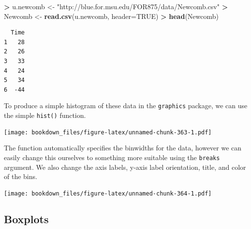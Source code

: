 \documentclass[]{krantz}
\makeatletter
\newenvironment{Shaded}{\begin{snugshade}}{\end{snugshade}}
\newcommand{\KeywordTok}[1]{\textcolor[rgb]{0.27,0.27,0.27}{\textbf{#1}}}
\newcommand{\DataTypeTok}[1]{\textcolor[rgb]{0.27,0.27,0.27}{#1}}
\newcommand{\DecValTok}[1]{\textcolor[rgb]{0.06,0.06,0.06}{#1}}
\newcommand{\StringTok}[1]{\textcolor[rgb]{0.5,0.5,0.5}{#1}}
\newcommand{\OtherTok}[1]{\textcolor[rgb]{0.37,0.37,0.37}{#1}}
\newcommand{\OperatorTok}[1]{\textcolor[rgb]{0.43,0.43,0.43}{\textbf{#1}}}
\newcommand{\NormalTok}[1]{#1}
\newenvironment{kframe}{%
\medskip{}
\setlength{\fboxsep}{.8em}
 \def\at@end@of@kframe{}%
 \ifinner\ifhmode%
  \def\at@end@of@kframe{\end{minipage}}%
  \begin{minipage}{\columnwidth}%
 \fi\fi%
 \def\FrameCommand##1{\hskip\@totalleftmargin \hskip-\fboxsep
 \colorbox{shadecolor}{##1}\hskip-\fboxsep
     \hskip-\linewidth \hskip-\@totalleftmargin \hskip\columnwidth}%
 \MakeFramed {\advance\hsize-\width
   \@totalleftmargin\z@ \linewidth\hsize
   \@setminipage}}%
 {\par\unskip\endMakeFramed%
 \at@end@of@kframe}
\renewenvironment{Shaded}{\begin{kframe}}{\end{kframe}}
\makeatother
\begin{document}
\begin{Shaded}
\begin{Highlighting}[]
\OperatorTok{>}\StringTok{ }\NormalTok{u.newcomb <-}\StringTok{ "http://blue.for.msu.edu/FOR875/data/Newcomb.csv"}
\OperatorTok{>}\StringTok{ }\NormalTok{Newcomb <-}\StringTok{ }\KeywordTok{read.csv}\NormalTok{(u.newcomb, }\DataTypeTok{header=}\OtherTok{TRUE}\NormalTok{)}
\OperatorTok{>}\StringTok{ }\KeywordTok{head}\NormalTok{(Newcomb)}
\end{Highlighting}
\end{Shaded}

\begin{verbatim}
  Time
1   28
2   26
3   33
4   24
5   34
6  -44
\end{verbatim}

To produce a simple histogram of these data in the \texttt{graphics}
package, we can use the simple \texttt{hist()} function.

\begin{Shaded}
\end{Shaded}

\texttt{[image: bookdown\_files/figure-latex/unnamed-chunk-363-1.pdf]}

The function automatically specifies the binwidths for the data, however
we can easily change this ourselves to something more suitable using the
\texttt{breaks} argument. We also change the axis labels, y-axis label
orientation, title, and color of the bins.

\begin{Shaded}
\end{Shaded}

\texttt{[image: bookdown\_files/figure-latex/unnamed-chunk-364-1.pdf]}

\subsection{Boxplots}\label{boxplots-1}
\end{document}
